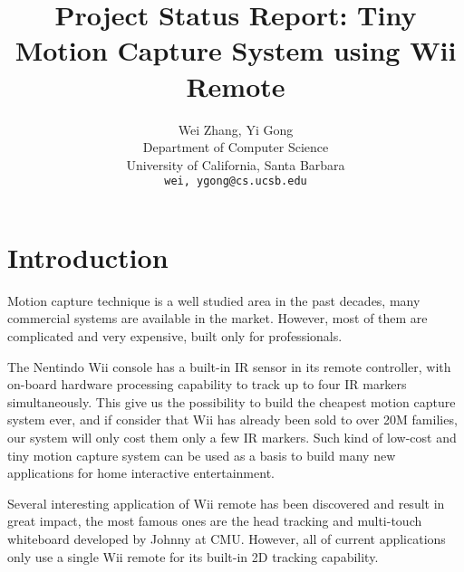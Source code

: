 \documentclass[10pt,twocolumn,letterpaper]{article}
\begin{document}
\title{Project Status Report: Tiny Motion Capture System using Wii Remote}

\author{Wei Zhang, Yi Gong\\
Department of Computer Science\\
University of California, Santa Barbara\\
{\tt\small wei, ygong@cs.ucsb.edu}\\
}

\maketitle
\thispagestyle{empty}



\section{Introduction}
Motion capture technique is a well studied area in the past decades, 
many commercial systems are available in the market. However, most of them 
are complicated and very expensive, built only for professionals.

The Nentindo Wii console has a built-in IR sensor in its remote
controller, with on-board hardware processing capability to track
up to four IR markers simultaneously. This give us the possibility
to build the cheapest motion capture system ever, 
and if consider that Wii has
already been sold to over 20M families, 
our system will only cost them only a few IR markers. 
Such kind of low-cost and tiny motion capture system can be used as a basis 
to build many new applications for home interactive entertainment.

Several interesting application of Wii remote has been discovered 
and result in great impact, the most famous ones are the head tracking
and multi-touch whiteboard developed by Johnny at CMU\cite{Johnny07}.
However, all of current applications only use a single Wii remote for 
its built-in 2D tracking capability.
\end{document}
